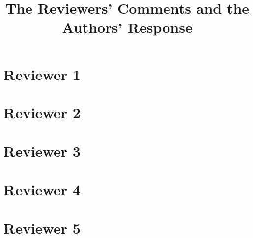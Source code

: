 \documentclass{article}
\begin{document}

  \title{The Reviewers' Comments and the Authors' Response}

  \author{}
  \date{}

  \maketitle

  \section*{Reviewer 1}
  

  \section*{Reviewer 2}
  

  \section*{Reviewer 3}
  

  \section*{Reviewer 4}
  

  \section*{Reviewer 5}
  
\end{document}
